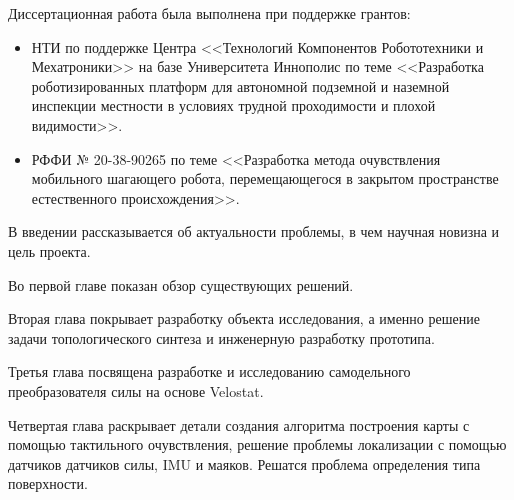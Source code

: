 

Диссертационная работа была выполнена при поддержке грантов:
\begin{itemize}
    \item НТИ по поддержке Центра <<Технологий Компонентов Робототехники и Мехатроники>> на базе Университета Иннополис по теме <<Разработка роботизированных платформ для автономной подземной и наземной инспекции местности в условиях трудной проходимости и плохой видимости>>. 
    \item РФФИ № 20-38-90265 по теме <<Разработка метода очувствления мобильного шагающего робота, перемещающегося в закрытом пространстве естественного происхождения>>.
\end{itemize}

{\struct}
В введении рассказывается об актуальности проблемы, в чем научная новизна и цель проекта.

Во первой главе показан обзор существующих решений.

Вторая глава покрывает разработку объекта исследования, а именно решение задачи топологического синтеза и инженерную разработку прототипа.

Третья глава посвящена разработке и исследованию самодельного преобразователя силы на основе Velostat.

Четвертая глава раскрывает детали создания алгоритма построения карты с помощью тактильного очувствления, решение проблемы локализации с помощью датчиков датчиков силы, IMU и маяков. Решатся проблема определения типа поверхности.